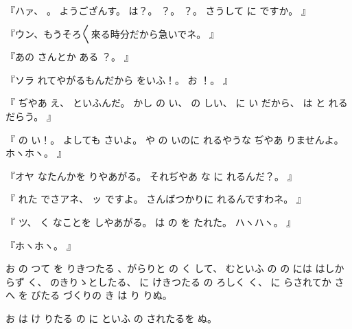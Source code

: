 『ハァ、
。
ようござんす。
は？。
？。
？。
さうして
に
ですか。
』

『ウン、もうそろ〳〵來る時分だから急いでネ。
』

『あの
さんとか
ある
？。
』

『ソラ
れてやがるもんだから
をいふ！。
お
！。
』

『
ぢやあ
え、
といふんだ。
かし
の
い、
の
しい、
に
い
だから、
は
と
れるだらう。
』

『
の
い！。
よしても
さいよ。
や
の
いのに
れるやうな
ぢやあ
りませんよ。
ホヽホヽ。
』

『オヤ
なたんかを
りやあがる。
それぢやあ
な
に
れるんだ？。
』

『
れた
でさアネ、
ッ
ですよ。
さんばつかりに
れるんですわネ。
』

『
ツ、
く
なことを
しやあがる。
は
の
を
たれた。
ハヽハヽ。
』

『ホヽホヽ。
』

お
の
つて
を
りきつたる
、がらりと
の
く
して、
むといふ
の
の
には
はしからず
く、
のきりゝとしたる、
に
けきつたる
の
ろしく
く、
に
らされてか
さへ
を
びたる
づくりの
き
は
り
りぬ。

お
は
け
りたる
の
に
といふ
の
されたるを
ぬ。


